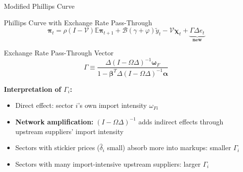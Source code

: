 \documentclass[aspectratio=169]{beamer}
\begin{document}
\begin{frame}{Modified Phillips Curve}

\begin{exampleblock}{Phillips Curve with Exchange Rate Pass-Through}
\begin{equation*}
    \bm{\pi}_t = \rho(I-\mathcal{V})\mathbb{E}\bm{\pi}_{t+1} + \mathcal{B}(\gamma+\varphi)\tilde{y}_t - \mathcal{V}\bm{\chi}_t + \underbrace{\Gamma\Delta e_t}_{\textbf{new}}
\end{equation*}
\end{exampleblock}

\begin{block}{Exchange Rate Pass-Through Vector}
\begin{equation*}
    \Gamma \equiv \frac{\Delta(I-\Omega\Delta)^{-1}\bm{\omega}_F}{1 - \bm{\beta}^T\Delta(I-\Omega\Delta)^{-1}\bm{\alpha}}
\end{equation*}
\end{block}

\textbf{Interpretation of $\Gamma_i$:}
\begin{itemize}
    \item Direct effect: sector $i$'s own import intensity $\omega_{Fi}$
    \item \textbf{Network amplification:} $(I-\Omega\Delta)^{-1}$ adds indirect effects through upstream suppliers' import intensity
    \item Sectors with stickier prices ($\hat{\delta}_i$ small) absorb more into markups: smaller $\Gamma_i$
    \item Sectors with many import-intensive upstream suppliers: larger $\Gamma_i$
\end{itemize}
\end{frame}
\end{document}
